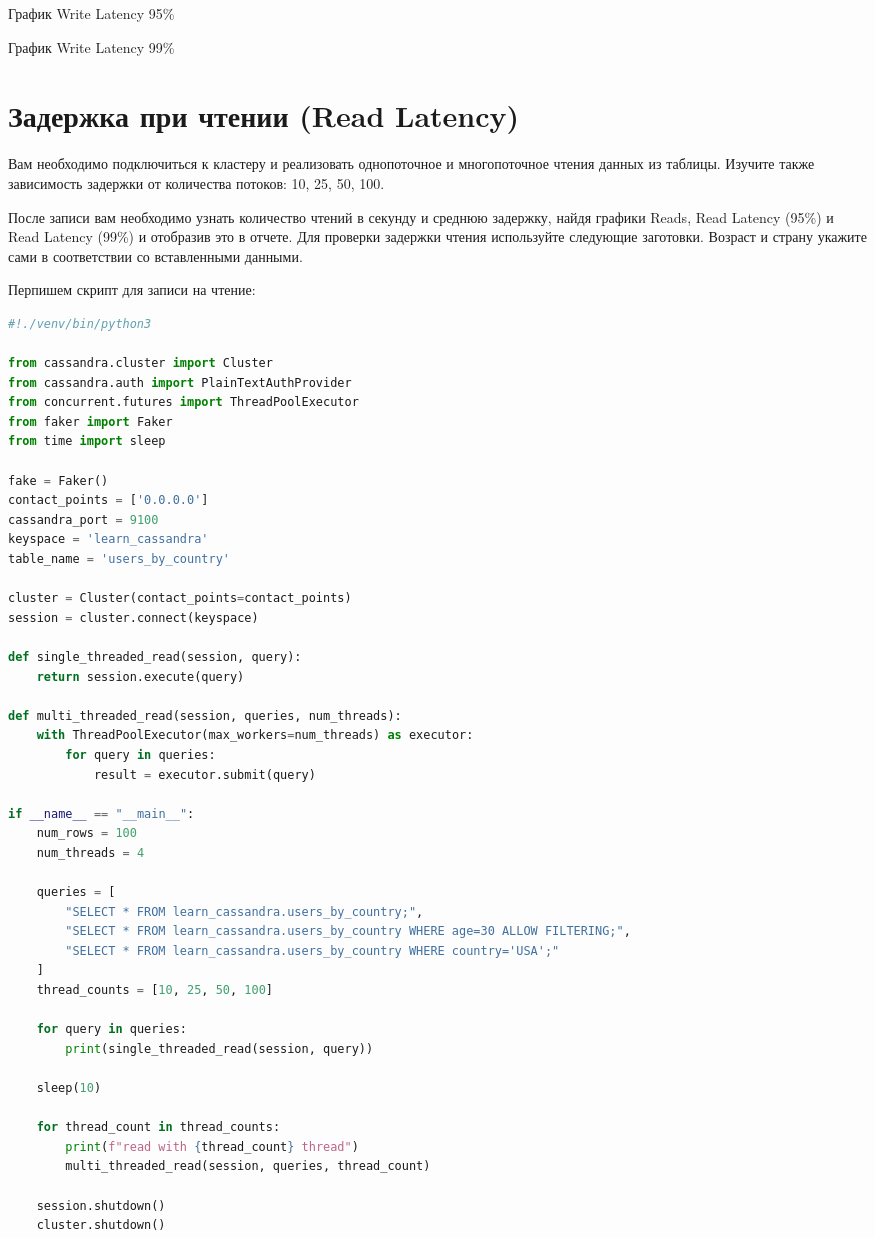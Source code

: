 \begin{image}
	\caption{График Write Latency 95\%}
	\label{fig:write_l95}
\end{image}

\begin{image}
	\caption{График Write Latency 99\%}
	\label{fig:write_l99}
\end{image}

\section{Задержка при чтении (Read Latency)}

Вам необходимо подключиться к кластеру и реализовать однопоточное и
многопоточное чтения данных из таблицы. Изучите также зависимость задержки
от количества потоков: 10, 25, 50, 100.\par
После записи вам необходимо узнать количество чтений в секунду и
среднюю задержку, найдя графики Reads, Read Latency (95\%) и Read Latency
(99\%) и отобразив это в отчете. Для проверки задержки чтения используйте
следующие заготовки. Возраст и страну укажите сами в соответствии со
вставленными данными.

Перпишем скрипт для записи на чтение:

\begin{lstlisting}[language=Python]
#!./venv/bin/python3

from cassandra.cluster import Cluster
from cassandra.auth import PlainTextAuthProvider
from concurrent.futures import ThreadPoolExecutor
from faker import Faker
from time import sleep

fake = Faker()
contact_points = ['0.0.0.0']
cassandra_port = 9100
keyspace = 'learn_cassandra'
table_name = 'users_by_country'

cluster = Cluster(contact_points=contact_points)
session = cluster.connect(keyspace)

def single_threaded_read(session, query):
    return session.execute(query)

def multi_threaded_read(session, queries, num_threads):
    with ThreadPoolExecutor(max_workers=num_threads) as executor:
        for query in queries:
            result = executor.submit(query)

if __name__ == "__main__":
    num_rows = 100
    num_threads = 4

    queries = [
        "SELECT * FROM learn_cassandra.users_by_country;",
        "SELECT * FROM learn_cassandra.users_by_country WHERE age=30 ALLOW FILTERING;",
        "SELECT * FROM learn_cassandra.users_by_country WHERE country='USA';"
    ]
    thread_counts = [10, 25, 50, 100]

    for query in queries:
        print(single_threaded_read(session, query))

	sleep(10)

    for thread_count in thread_counts:
        print(f"read with {thread_count} thread")
        multi_threaded_read(session, queries, thread_count)

    session.shutdown()
    cluster.shutdown()
\end{lstlisting}

